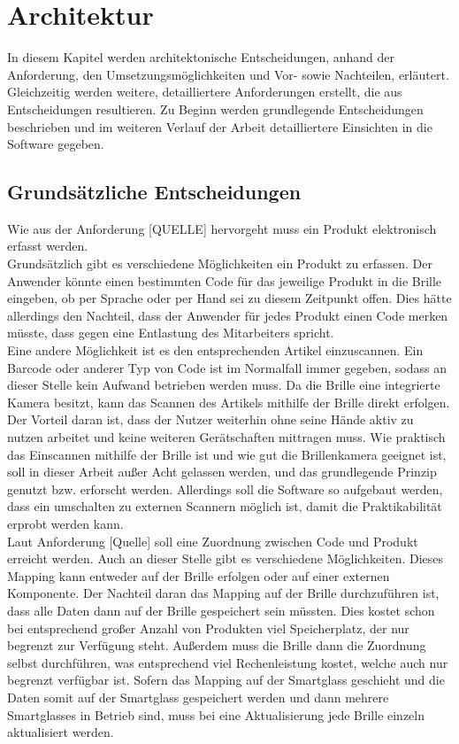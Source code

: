 \chapter{Architektur}
\label{cha:architektur}
In diesem Kapitel werden architektonische Entscheidungen, anhand der Anforderung, den Umsetzungsmöglichkeiten und Vor- sowie Nachteilen, erläutert. Gleichzeitig werden weitere, detailliertere Anforderungen erstellt, die aus Entscheidungen resultieren. Zu Beginn werden grundlegende Entscheidungen beschrieben und im weiteren Verlauf der Arbeit detailliertere Einsichten in die Software gegeben.
\section{Grundsätzliche Entscheidungen}
\label{sec:grund_entscheidungen}
Wie aus der Anforderung [QUELLE] hervorgeht muss ein Produkt elektronisch erfasst werden. 
\\
Grundsätzlich gibt es verschiedene Möglichkeiten ein Produkt zu erfassen. 
Der Anwender könnte einen bestimmten Code für das jeweilige Produkt in die Brille eingeben, ob per Sprache oder per Hand sei zu diesem Zeitpunkt offen. Dies hätte allerdings den Nachteil, dass der Anwender für jedes Produkt einen Code merken müsste, dass gegen eine Entlastung des Mitarbeiters spricht.
\\
Eine andere Möglichkeit ist es den entsprechenden Artikel einzuscannen. Ein Barcode oder anderer Typ von Code ist im Normalfall immer gegeben, sodass an dieser Stelle kein Aufwand betrieben werden muss. Da die Brille eine integrierte Kamera besitzt, kann das Scannen des Artikels mithilfe der Brille direkt erfolgen. Der Vorteil daran ist, dass der Nutzer weiterhin ohne seine Hände aktiv zu nutzen arbeitet und keine weiteren Gerätschaften mittragen muss. Wie praktisch das Einscannen mithilfe der Brille ist und wie gut die Brillenkamera geeignet ist, soll in dieser Arbeit außer Acht gelassen werden, und das grundlegende Prinzip genutzt bzw. erforscht werden. 
Allerdings soll die Software so aufgebaut werden, dass ein umschalten zu externen Scannern möglich ist, damit die Praktikabilität erprobt werden kann.
\\
Laut Anforderung [Quelle] soll eine Zuordnung zwischen Code und Produkt erreicht werden.
Auch an dieser Stelle gibt es verschiedene Möglichkeiten. 
Dieses Mapping kann entweder auf der Brille erfolgen oder auf einer externen Komponente. Der Nachteil daran das Mapping auf der Brille durchzuführen ist, dass alle Daten dann auf der Brille gespeichert sein müssten. Dies kostet schon bei entsprechend großer Anzahl von Produkten viel Speicherplatz, der nur begrenzt zur Verfügung steht. Außerdem muss die Brille dann die Zuordnung selbst durchführen, was entsprechend viel Rechenleistung kostet, welche auch nur begrenzt verfügbar ist. Sofern das Mapping auf der Smartglass geschieht und die Daten somit auf der Smartglass gespeichert werden und dann mehrere Smartglasses in Betrieb sind, muss bei eine Aktualisierung jede Brille einzeln aktualisiert werden. 

